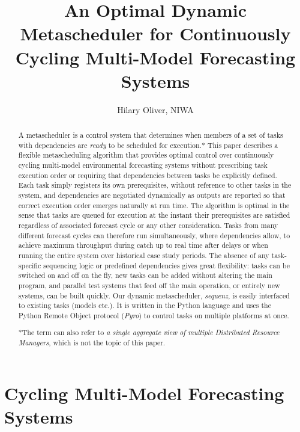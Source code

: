 \documentclass[11pt,a4paper]{article}
\title{An Optimal Dynamic Metascheduler for Continuously Cycling
Multi-Model Forecasting Systems}
\author{Hilary Oliver, NIWA}
\begin{document}
\maketitle

\begin{abstract} A metascheduler is a control system that determines
    when members of a set of tasks with dependencies are {\em ready} to
    be scheduled for execution.* This paper describes a flexible
    metascheduling algorithm that provides optimal control over
    continuously cycling multi-model environmental forecasting systems
    without prescribing task execution order or requiring that
    dependencies between tasks be explicitly defined. Each task simply
    registers its own prerequisites, without reference to other tasks in
    the system, and dependencies are negotiated dynamically as outputs
    are reported so that correct execution order emerges naturally at
    run time.  The algorithm is optimal in the sense that tasks are
    queued for execution at the instant their prerequisites are
    satisfied regardless of associated forecast cycle or any other
    consideration. Tasks from many different forecast cycles can
    therefore run simultaneously, where dependencies allow, to achieve
    maximum throughput during catch up to real time after delays or when
    running the entire system over historical case study periods. The
    absence of any task-specific sequencing logic or predefined
    dependencies gives great flexibility: tasks can be switched on and
    off on the fly, new tasks can be added without altering the main
    program, and parallel test systems that feed off the main operation,
    or entirely new systems, can be built quickly.  Our dynamic
    metascheduler, {\em sequenz}, is easily interfaced to existing tasks
    (models etc.). It is written in the Python language and uses the
    Python Remote Object protocol ({\em Pyro}) to control tasks on
    multiple platforms at once. 

*The term can also refer to {\it a single aggregate view of multiple
Distributed Resource Managers}, which is not the topic of this paper.

\end{abstract}

\pagebreak
\tableofcontents
\pagebreak

\section{Cycling Multi-Model Forecasting Systems}
\end{document}
